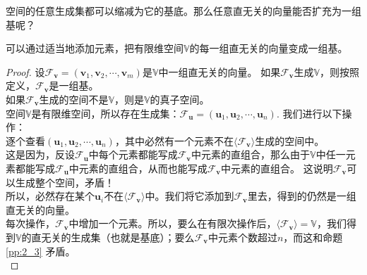 \documentclass[12pt,UTF8,fontset=none]{ctexbook}
\begin{document}
空间的任意生成集都可以缩减为它的基底。那么任意直无关的向量能否扩充为一组基呢？
\begin{pp}\label{pp:2_7}
    可以通过适当地添加元素，把有限维空间$\mathbb{V}$的每一组直无关的向量变成一组基。
\end{pp}
\begin{proof} %
    设$\mathcal{F}_{\mathbf{v}} = (\mathbf{v}_1, \mathbf{v}_2, \cdots , \mathbf{v}_m )$是$\mathbb{V}$中一组直无关的向量。
    如果$\mathcal{F}_{\mathbf{v}}$生成$\mathbb{V}$，则按照定义，$\mathcal{F}_{\mathbf{v}}$是一组基。\\
    如果$\mathcal{F}_{\mathbf{v}}$生成的空间不是$\mathbb{V}$，则是$\mathbb{V}$的真子空间。\\
    空间$\mathbb{V}$是有限维空间，所以存在生成集：$\mathcal{F}_{\mathbf{u}} = (\mathbf{u}_1, \mathbf{u}_2, \cdots , \mathbf{u}_n )$. 我们进行以下操作：\\
    逐个查看$(\mathbf{u}_1, \mathbf{u}_2, \cdots , \mathbf{u}_n )$，其中必然有一个元素不在$\langle\mathcal{F}_{\mathbf{v}}\rangle$生成的空间中。\\
    这是因为，反设$\mathcal{F}_{\mathbf{u}}$中每个元素都能写成$\mathcal{F}_{\mathbf{v}}$中元素的直组合，那么由于$\mathbb{V}$中任一元素都能写成$\mathcal{F}_{\mathbf{u}}$中元素的直组合，从而也能写成$\mathcal{F}_{\mathbf{v}}$中元素的直组合。
    这说明$\mathcal{F}_{\mathbf{v}}$可以生成整个空间，矛盾！\\
    所以，必然存在某个$\mathbf{u}_i$不在$\langle\mathcal{F}_{\mathbf{v}}\rangle$中。我们将它添加到$\mathcal{F}_{\mathbf{v}}$里去，得到的仍然是一组直无关的向量。\\
    每次操作，$\mathcal{F}_{\mathbf{v}}$中增加一个元素。所以，要么在有限次操作后，$\langle\mathcal{F}_{\mathbf{v}}\rangle = \mathbb{V}$，我们得到$\mathbb{V}$的直无关的生成集（也就是基底）；要么$\mathcal{F}_{\mathbf{v}}$中元素个数超过$n$，而这和命题\ref{pp:2_3} 矛盾。\\
\end{proof}
\end{document}
